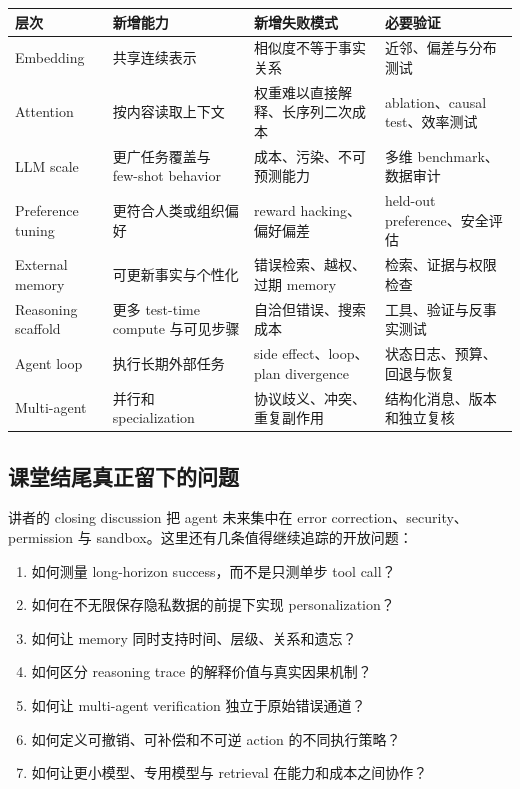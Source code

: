 \begin{center}
\begin{longtable}{L{0.17\textwidth} L{0.22\textwidth} L{0.24\textwidth} L{0.25\textwidth}}
\toprule
层次 & 新增能力 & 新增失败模式 & 必要验证 \\
\midrule
\endhead
Embedding & 共享连续表示 & 相似度不等于事实关系 & 近邻、偏差与分布测试 \\
Attention & 按内容读取上下文 & 权重难以直接解释、长序列二次成本 & ablation、causal test、效率测试 \\
LLM scale & 更广任务覆盖与 few-shot behavior & 成本、污染、不可预测能力 & 多维 benchmark、数据审计 \\
Preference tuning & 更符合人类或组织偏好 & reward hacking、偏好偏差 & held-out preference、安全评估 \\
External memory & 可更新事实与个性化 & 错误检索、越权、过期 memory & 检索、证据与权限检查 \\
Reasoning scaffold & 更多 test-time compute 与可见步骤 & 自洽但错误、搜索成本 & 工具、验证与反事实测试 \\
Agent loop & 执行长期外部任务 & side effect、loop、plan divergence & 状态日志、预算、回退与恢复 \\
Multi-agent & 并行和 specialization & 协议歧义、冲突、重复副作用 & 结构化消息、版本和独立复核 \\
\bottomrule
\end{longtable}
\end{center}

\subsection{课堂结尾真正留下的问题}

讲者的 closing discussion 把 agent 未来集中在 error correction、security、permission 与 sandbox。这里还有几条值得继续追踪的开放问题：

\begin{enumerate}
  \item 如何测量 long-horizon success，而不是只测单步 tool call？
  \item 如何在不无限保存隐私数据的前提下实现 personalization？
  \item 如何让 memory 同时支持时间、层级、关系和遗忘？
  \item 如何区分 reasoning trace 的解释价值与真实因果机制？
  \item 如何让 multi-agent verification 独立于原始错误通道？
  \item 如何定义可撤销、可补偿和不可逆 action 的不同执行策略？
  \item 如何让更小模型、专用模型与 retrieval 在能力和成本之间协作？
\end{enumerate}

